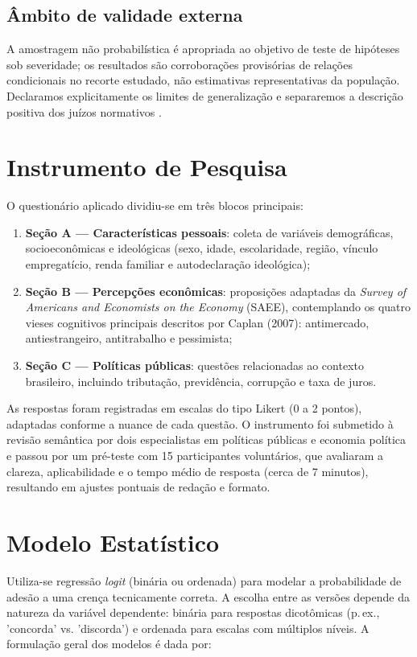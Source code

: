 \subsection{Âmbito de validade externa}
A amostragem não probabilística é apropriada ao objetivo de teste de hipóteses sob severidade; os resultados são corroborações provisórias de relações condicionais no recorte estudado, não estimativas representativas da população. Declaramos explicitamente os limites de generalização e separaremos a descrição positiva dos juízos normativos \cite{hausman2008}.


\section{Instrumento de Pesquisa}

O questionário aplicado dividiu-se em três blocos principais:
\begin{enumerate}[label=\alph*)]
    \item \textbf{Seção A — Características pessoais}: coleta de variáveis demográficas, socioeconômicas e ideológicas (sexo, idade, escolaridade, região, vínculo empregatício, renda familiar e autodeclaração ideológica);
    \item \textbf{Seção B — Percepções econômicas}: proposições adaptadas da \textit{Survey of Americans and Economists on the Economy} (SAEE), contemplando os quatro vieses cognitivos principais descritos por Caplan (2007): antimercado, antiestrangeiro, antitrabalho e pessimista;
    \item \textbf{Seção C — Políticas públicas}: questões relacionadas ao contexto brasileiro, incluindo tributação, previdência, corrupção e taxa de juros.
\end{enumerate}

As respostas foram registradas em escalas do tipo Likert (0 a 2 pontos), adaptadas conforme a nuance de cada questão. O instrumento foi submetido à revisão semântica por dois especialistas em políticas públicas e economia política e passou por um pré-teste com 15 participantes voluntários, que avaliaram a clareza, aplicabilidade e o tempo médio de resposta (cerca de 7 minutos), resultando em ajustes pontuais de redação e formato.

\section{Modelo Estatístico}\label{sec:modelo-estatistico}

Utiliza-se regressão \textit{logit} (binária ou ordenada) para modelar a probabilidade de adesão a uma crença tecnicamente correta. A escolha entre as versões depende da natureza da variável dependente: binária para respostas dicotômicas (p.\,ex., 'concorda' vs. 'discorda') e ordenada para escalas com múltiplos níveis. A formulação geral dos modelos é dada por:

